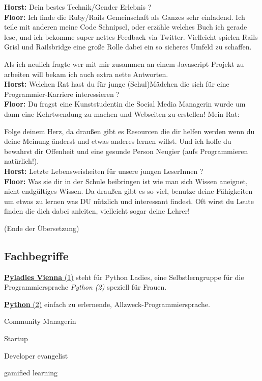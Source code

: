 \textbf{Horst:}  Dein bestes Technik/Gender Erlebnis ? \\
\textbf{Floor:} Ich finde die Ruby/Rails Gemeinschaft als Ganzes sehr einladend. Ich teile mit anderen meine Code Schnipsel, oder erzähle welches Buch ich gerade lese, und ich bekomme super nettes Feedback via Twitter. Vielleicht spielen Rails Grisl und Railsbridge eine große Rolle dabei ein so sicheres Umfeld zu schaffen.

Als ich neulich fragte wer mit mir zusammen an einem Javascript Projekt zu arbeiten will bekam ich auch extra nette Antworten. \\
\textbf{Horst:} Welchen Rat hast du für junge (Schul)Mädchen die sich für eine Programmier-Karriere interessieren ? \\
\textbf{Floor:} Du fragst eine Kunststudentin die Social Media Managerin wurde um dann eine Kehrtwendung zu machen und Webseiten zu erstellen! Mein Rat: 

Folge deinem Herz, da draußen gibt es Resourcen die dir helfen werden wenn du deine Meinung änderst und etwas anderes lernen willst. Und ich hoffe du bewahrst dir Offenheit und eine gesunde Person Neugier (aufs Programmieren natürlich!). \\
\textbf{Horst:} Letzte Lebensweisheiten für unsere jungen LeserInnen ? \\
\textbf{Floor:} Was sie dir in der Schule beibringen ist wie man sich Wissen aneignet, nicht endgültiges Wissen. Da draußen gibt es so viel, benutze deine Fähigkeiten um etwas zu lernen was DU nützlich und interessant findest. Oft wirst du Leute finden die dich dabei anleiten, vielleicht sogar deine Lehrer!

(Ende der Übersetzung)

\subsection*{Fachbegriffe}

\href{https://twitter.com/pyladies_vie}{\textbf{Pyladies Vienna} (1)} steht für Python Ladies, eine Selbstlerngruppe für die Programmiersprache  \textit{Python (2)} speziell für Frauen. 

\href{http://python.org}{\textbf{Python} (2)} einfach zu erlernende, Allzweck-Programmiersprache. 

Community Managerin

Startup

Developer evangelist

gamified learning

